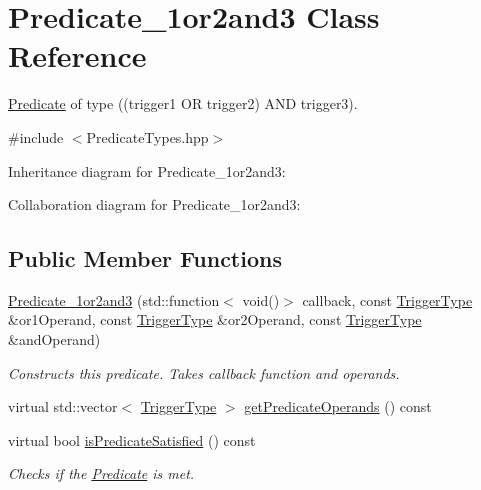 \hypertarget{classPredicate__1or2and3}{}\section{Predicate\+\_\+1or2and3 Class Reference}
\label{classPredicate__1or2and3}


\hyperlink{classPredicate}{Predicate} of type ((trigger1 OR trigger2) A\+ND trigger3).  




{\ttfamily \#include $<$Predicate\+Types.\+hpp$>$}



Inheritance diagram for Predicate\+\_\+1or2and3\+:


Collaboration diagram for Predicate\+\_\+1or2and3\+:
\subsection*{Public Member Functions}
\begin{DoxyCompactItemize}
\item 
\hyperlink{classPredicate__1or2and3_a6dd5264bc2759b2a799763ee75c81679}{Predicate\+\_\+1or2and3} (std\+::function$<$ void()$>$ callback, const \hyperlink{structTriggerType}{Trigger\+Type} \&or1\+Operand, const \hyperlink{structTriggerType}{Trigger\+Type} \&or2\+Operand, const \hyperlink{structTriggerType}{Trigger\+Type} \&and\+Operand)\hypertarget{classPredicate__1or2and3_a6dd5264bc2759b2a799763ee75c81679}{}\label{classPredicate__1or2and3_a6dd5264bc2759b2a799763ee75c81679}

\begin{DoxyCompactList}\small\item\em Constructs this predicate. Takes callback function and operands. \end{DoxyCompactList}\item 
virtual std\+::vector$<$ \hyperlink{structTriggerType}{Trigger\+Type} $>$ \hyperlink{classPredicate__1or2and3_ada2177d1a46e192c2ba2429bcb7ed8e5}{get\+Predicate\+Operands} () const 
\item 
virtual bool \hyperlink{classPredicate__1or2and3_aae17c4d95f403c995a56c11e8a31bfb8}{is\+Predicate\+Satisfied} () const \hypertarget{classPredicate__1or2and3_aae17c4d95f403c995a56c11e8a31bfb8}{}\label{classPredicate__1or2and3_aae17c4d95f403c995a56c11e8a31bfb8}

\begin{DoxyCompactList}\small\item\em Checks if the \hyperlink{classPredicate}{Predicate} is met. \end{DoxyCompactList}\end{DoxyCompactItemize}
